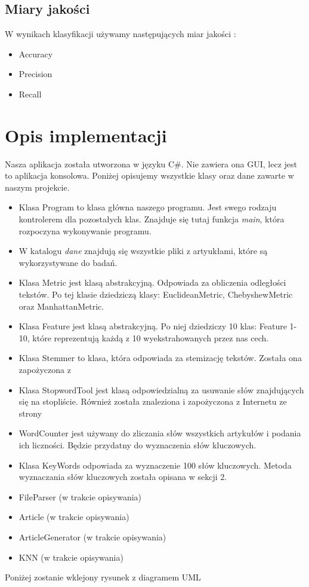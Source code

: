 \documentclass{classrep}
\begin{document}
\subsection{Miary jakości}
W wynikach klasyfikacji używamy następujących miar jakości \cite{apr}:
\begin{itemize}
\item Accuracy
\item Precision
\item Recall
\end{itemize}



\section{Opis implementacji} %
Nasza aplikacja została utworzona w języku C\#. Nie zawiera ona GUI, lecz jest to aplikacja konsolowa. Poniżej opisujemy wszystkie klasy oraz dane zawarte w naszym projekcie.
\begin{itemize}
\item Klasa Program to klasa główna naszego programu. Jest swego rodzaju kontrolerem dla pozostałych klas. Znajduje się tutaj funkcja \textsl{main}, która rozpoczyna wykonywanie programu.
\item W katalogu \textsl{dane} znajdują się wszystkie pliki z artyukłami, które są wykorzystywane do badań.
\item Klasa Metric jest klasą abstrakcyjną. Odpowiada za obliczenia odległości tekstów. Po tej klasie dziedziczą klasy: EuclideanMetric, ChebyshewMetric oraz ManhattanMetric.
\item Klasa Feature jest klasą abstrakcyjną. Po niej dziedziczy 10 klas: Feature 1-10, które reprezentują każdą z 10 wyekstrahowanych przez nas cech.
\item Klasa Stemmer to klasa, która odpowiada za stemizację tekstów. Została ona zapożyczona z \cite{stemmer}
\item Klasa StopwordTool jest klasą odpowiedzialną za usuwanie słów znajdujących się na stopliście. Również została znaleziona i zapożyczona z Internetu ze strony \cite{stopword}
\item WordCounter jest używany do zliczania słów wszystkich artykułów i podania ich liczności. Będzie przydatny do  wyznaczenia słów kluczowych.
\item Klasa KeyWords odpowiada za wyznaczenie 100 słów kluczowych. Metoda wyznaczania słów kluczowych została opisana w sekcji 2.
\item FileParser (w trakcie opisywania)
\item Article (w trakcie opisywania)
\item ArticleGenerator (w trakcie opisywania)
\item KNN (w trakcie opisywania)
\end{itemize}
Poniżej zostanie wklejony rysunek z diagramem UML
\end{document}
